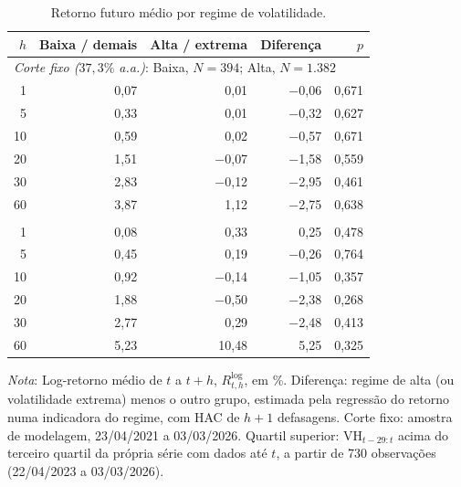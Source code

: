 \begin{table}[H]
\centering
\small
\caption{Retorno futuro médio por regime de volatilidade.}
\label{tab:retnl-retorno-regime}
\begin{tabular}{rrrrr}
\toprule
$h$ & Baixa / demais & Alta / extrema & Diferença & $p$ \\
\midrule
\multicolumn{5}{l}{\textit{Corte fixo ($37{,}3\%$ a.a.)}: Baixa, $N = 394$; Alta, $N = 1{.}382$} \\
1 & 0{,}07 & 0{,}01 & $-$0{,}06 & 0{,}671 \\
5 & 0{,}33 & 0{,}01 & $-$0{,}32 & 0{,}627 \\
10 & 0{,}59 & 0{,}02 & $-$0{,}57 & 0{,}671 \\
20 & 1{,}51 & $-$0{,}07 & $-$1{,}58 & 0{,}559 \\
30 & 2{,}83 & $-$0{,}12 & $-$2{,}95 & 0{,}461 \\
60 & 3{,}87 & 1{,}12 & $-$2{,}75 & 0{,}638 \\
\addlinespace
\multicolumn{5}{l}{\textit{Quartil superior em janela expansiva}: Demais, $N = 983$; Extrema, $N = 64$} \\
1 & 0{,}08 & 0{,}33 & 0{,}25 & 0{,}478 \\
5 & 0{,}45 & 0{,}19 & $-$0{,}26 & 0{,}764 \\
10 & 0{,}92 & $-$0{,}14 & $-$1{,}05 & 0{,}357 \\
20 & 1{,}88 & $-$0{,}50 & $-$2{,}38 & 0{,}268 \\
30 & 2{,}77 & 0{,}29 & $-$2{,}48 & 0{,}413 \\
60 & 5{,}23 & 10{,}48 & 5{,}25 & 0{,}325 \\
\bottomrule
\end{tabular}
\par\smallskip
\parbox{0.95\linewidth}{\footnotesize\textit{Nota}: Log-retorno médio de $t$ a $t+h$, $R^{\log}_{t,h}$, em \%. Diferença: regime de alta (ou volatilidade extrema) menos o outro grupo, estimada pela regressão do retorno numa indicadora do regime, com HAC de $h+1$ defasagens. Corte fixo: amostra de modelagem, 23/04/2021 a 03/03/2026. Quartil superior: $\text{VH}_{t-29:t}$ acima do terceiro quartil da própria série com dados até $t$, a partir de 730 observações (22/04/2023 a 03/03/2026).}
\end{table}
